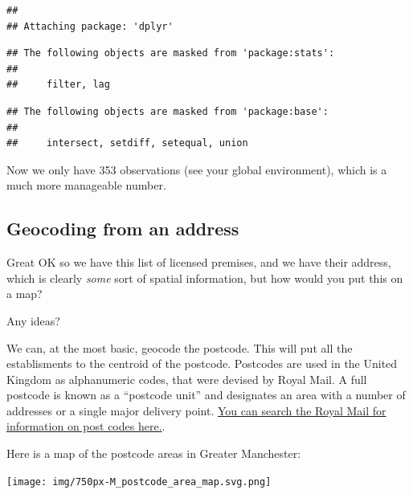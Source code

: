 \documentclass[]{book}
\newenvironment{Shaded}{\begin{snugshade}}{\end{snugshade}}
\newcommand{\CommentTok}[1]{\textcolor[rgb]{0.56,0.35,0.01}{\textit{#1}}}
\newcommand{\KeywordTok}[1]{\textcolor[rgb]{0.13,0.29,0.53}{\textbf{#1}}}
\newcommand{\NormalTok}[1]{#1}
\newcommand{\OperatorTok}[1]{\textcolor[rgb]{0.81,0.36,0.00}{\textbf{#1}}}
\newcommand{\StringTok}[1]{\textcolor[rgb]{0.31,0.60,0.02}{#1}}
\begin{document}
\begin{verbatim}
## 
## Attaching package: 'dplyr'
\end{verbatim}

\begin{verbatim}
## The following objects are masked from 'package:stats':
## 
##     filter, lag
\end{verbatim}

\begin{verbatim}
## The following objects are masked from 'package:base':
## 
##     intersect, setdiff, setequal, union
\end{verbatim}

\begin{Shaded}
\end{Shaded}

Now we only have 353 observations (see your global environment), which is a much more manageable number.

\hypertarget{geocoding-from-an-address}{%
\subsection{Geocoding from an address}\label{geocoding-from-an-address}}

Great OK so we have this list of licensed premises, and we have their address, which is clearly \emph{some} sort of spatial information, but how would you put this on a map?

Any ideas?

We can, at the most basic, geocode the postcode. This will put all the establisments to the centroid of the postcode. Postcodes are used in the United Kingdom as alphanumeric codes, that were devised by Royal Mail. A full postcode is known as a ``postcode unit'' and designates an area with a number of addresses or a single major delivery point. \href{https://www.royalmail.com/business/search/google/POSTCODE}{You can search the Royal Mail for information on post codes here.}.

Here is a map of the postcode areas in Greater Manchester:

\texttt{[image: img/750px-M\_postcode\_area\_map.svg.png]}
\end{document}
